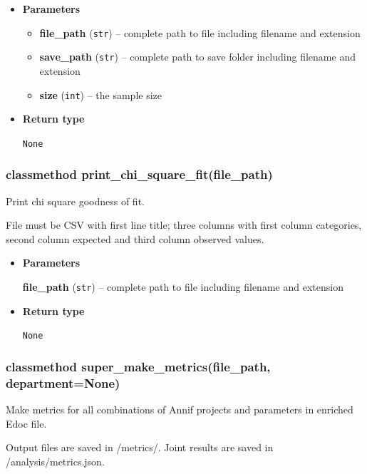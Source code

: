 \begin{itemize}
\item
  \textbf{Parameters}

  \begin{itemize}
  \item
    \textbf{file\_path} (\texttt{str}) -- complete path to file
    including filename and extension
  \item
    \textbf{save\_path} (\texttt{str}) -- complete path to save folder
    including filename and extension
  \item
    \textbf{size} (\texttt{int}) -- the sample size
  \end{itemize}
\item
  \textbf{Return type}

  \texttt{None}
\end{itemize}

\hypertarget{classmethod-print_chi_square_fitfile_path}{%
\subsubsection{classmethod
print\_chi\_square\_fit(file\_path)}\label{classmethod-print_chi_square_fitfile_path}}

Print chi square goodness of fit.

File must be CSV with first line title; three columns with first column
categories, second column expected and third column observed values.

\begin{itemize}
\item
  \textbf{Parameters}

  \textbf{file\_path} (\texttt{str}) -- complete path to file including
  filename and extension
\item
  \textbf{Return type}

  \texttt{None}
\end{itemize}

\hypertarget{classmethod-super_make_metricsfile_path-departmentnone}{%
\subsubsection{classmethod super\_make\_metrics(file\_path,
department=None)}\label{classmethod-super_make_metricsfile_path-departmentnone}}

Make metrics for all combinations of Annif projects and parameters in
enriched Edoc file.

Output files are saved in /metrics/. Joint results are saved in
/analysis/metrics.json.

